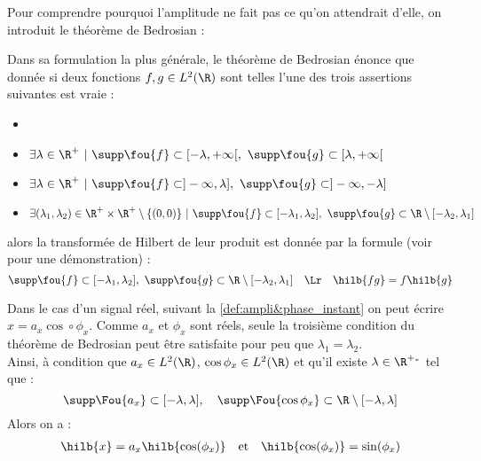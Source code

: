 Pour comprendre pourquoi l'amplitude ne fait pas ce qu'on attendrait d'elle, on introduit le théorème de Bedrosian :

\begin{theoreme}[de Bedrosian]\label{theo:2Bedrosian}
	Dans sa formulation la plus générale, le théorème de Bedrosian énonce que donnée si deux fonctions $f,g\in L^2(\R)$ sont telles l'une des trois assertions suivantes est vraie :
	\begin{itemize}
		\item 
		\item $\exists \lambda\in\R^+\ |\ \supp \fou{f} \subset [-\lambda, +\infty[,\ \supp \fou{g} \subset [\lambda, +\infty[$
		
		\item $\exists \lambda\in\R^+\ |\ \supp \fou{f} \subset ]-\infty, \lambda],\ \supp \fou{g} \subset ]-\infty,-\lambda]$
		
		\item $\exists (\lambda_1,\lambda_2)\in \R^+\times\R^+ \setminus\{(0,0)\}\ |\ \supp \fou{f} \subset [-\lambda_1, \lambda_2],\ \supp \fou{g} \subset \R\setminus[-\lambda_2,\lambda_1]$
	\end{itemize}
	alors la transformée de Hilbert de leur produit est donnée par la formule (voir \cite{wang_simple_2009} pour une démonstration) :
	\begin{equation}\label{eq:2Bedrosian}
		\supp \fou{f} \subset [-\lambda_1, \lambda_2],\ \supp \fou{g} \subset \R\setminus[-\lambda_2,\lambda_1]\quad \Lr\quad \hilb{fg} = f\hilb{g}
 	\end{equation}
\end{theoreme}
\begin{corollaire}\label{coro:AM-FM}
	Dans le cas d'un signal réel, suivant la \cref{def:ampli&phase_instant} on peut écrire \newline $x=a_x\cos\circ\phi_x$.
	Comme $a_x$ et $\phi_x$ sont réels, seule la troisième condition du théorème de Bedrosian peut être satisfaite pour peu que $\lambda_1=\lambda_2$.
	\\
	Ainsi, à condition que $a_x\in L^2(\R)$, $\cos\phi_x\in L^2(\R)$ et qu'il existe $\lambda\in\R^{+_*}$ tel que :
	\[\supp \Fou{a_x} \subset [-\lambda, \lambda],\quad \supp \Fou{\cos\phi_x} \subset \R\setminus[-\lambda,\lambda]\]
	 Alors on a :
	\begin{align*}
		\hilb{x} &= a_x\hilb{\cos(\phi_x)}  &  &\text{et}  &  \hilb{\cos(\phi_x)} = \sin(\phi_x)
	\end{align*}
\end{corollaire}



